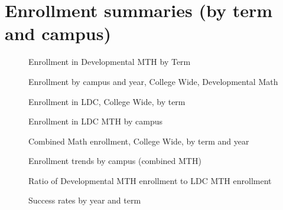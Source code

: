 \chapter{Enrollment summaries (by term and campus)}\label{sec:app:enrollment}

\begin{figure}[!htb]
	\centering
	
	\caption{Enrollment in Developmental MTH by Term}
\end{figure}
\begin{figure}[!htb]
	\centering
	
	\caption{Enrollment by campus and year, College Wide, Developmental Math}
    \label{app:fig:enrollmentDevelopCampus}
\end{figure}
\begin{figure}[!htb]
	\centering
	
	\caption{Enrollment in LDC, College Wide, by term}
\end{figure}
\begin{figure}[!htb]
	\centering
	
	\caption{Enrollment in LDC MTH by campus}
    \label{app:fig:enrollmentLDCCampus}
\end{figure}
\begin{figure}[!htb]
	\centering
	
	\caption{Combined Math enrollment, College Wide, by term and year}
    \label{app:fig:totalenrollmentTerm}
\end{figure}
\begin{figure}[!htb]
	\centering
	
	\caption{Enrollment trends by campus (combined MTH)}
    \label{app:fig:totalenrollmentCampus}
\end{figure}
\begin{figure}[!htb]
	\centering
	
	\caption{Ratio of Developmental MTH enrollment to LDC MTH enrollment}
    \label{app:fig:ratioDevelopToLDC}
\end{figure}
\begin{figure}[!htb]
	\centering
	
	\caption{Success rates by year and term}
\end{figure}

